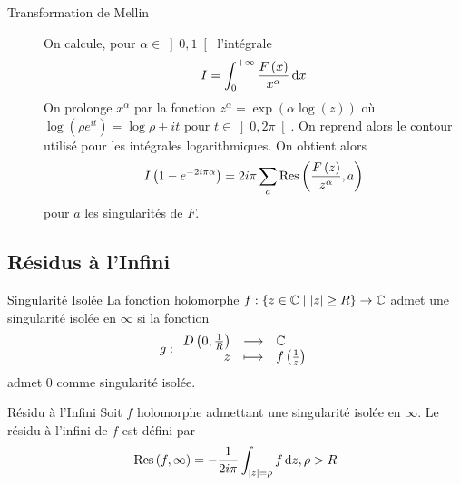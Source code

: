 \documentclass{cours}
\begin{document}
\begin{propositionfr}
\begin{description}
		\item[Transformation de Mellin] On calcule, pour $\alpha \in \left]0, 1\right[$ l'intégrale
			\begin{equation*}
				I = \int_{0}^{+\infty} \frac{F\left(x\right)}{x^{\alpha}}{\rm \, d} x
			\end{equation*}
			On prolonge $x^{\alpha}$ par la fonction $z^{\alpha} = \exp\left(\alpha \log\left(z\right)\right)$ où $\log\left(\rho e^{it}\right) = \log \rho + it$ pour $t \in \left]0, 2\pi\right[$.
			On reprend alors le contour utilisé pour les intégrales logarithmiques. 
			On obtient alors 
			\begin{equation*}
				I\left(1 - e^{-2i\pi \alpha}\right) = 2i\pi\sum_{a} \mathrm{Res}\left(\frac{F\left(z\right)}{z^{\alpha}}, a\right)
			\end{equation*}
			pour $a$ les singularités de $F$. 
	\end{description}
\end{propositionfr}

\subsection{Résidus à l'Infini}
\begin{définition}
	{Singularité Isolée}{}
	La fonction holomorphe $f : \left\{z \in \mathbb{C}\mid \left|z\right| \geq R\right\} \to \mathbb{C}$ admet une singularité isolée en $\infty$ si la fonction 
	\begin{equation*}g:
		\begin{array}{rcl}
			D\left(0, \frac{1}{R}\right) & \longrightarrow & \mathbb{C}\\
			z & \longmapsto & f\left(\frac{1}{z}\right)
		\end{array}
	\end{equation*}
	admet $0$ comme singularité isolée.
\end{définition}

\begin{définition}
	{Résidu à l'Infini}{}
	Soit $f$ holomorphe admettant une singularité isolée en $\infty$. Le résidu à l'infini de $f$ est défini par
	\begin{equation*}
		\mathrm{Res}\left(f, \infty\right) = -\frac{1}{2i\pi} \int_{\left|z\right| = \rho}f{\rm \, d} z, \rho > R
	\end{equation*}

\end{définition}
\end{document}
